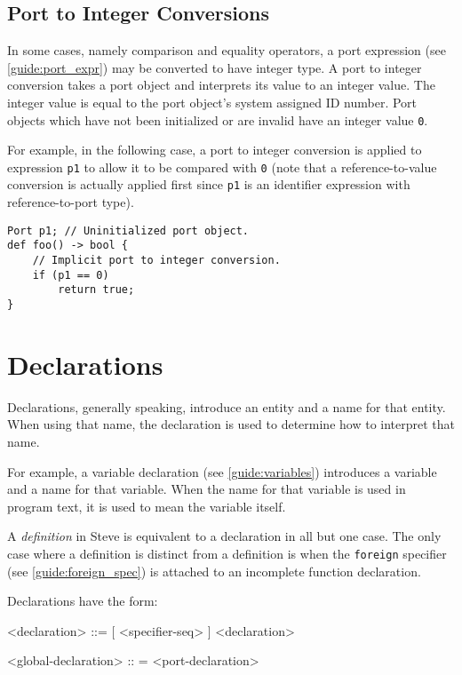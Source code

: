 \subsection{Port to Integer Conversions} \label{guide:port_conv}

In some cases, namely comparison and equality operators, a port expression (see \ref{guide:port_expr}) may be converted to have integer type. A port to integer conversion takes a port object and interprets its value to an integer value. The integer value is equal to the port object's system assigned ID number. Port objects which have not been initialized or are invalid have an integer value \texttt{0}.

For example, in the following case, a port to integer conversion is applied to expression \texttt{p1} to allow it to be compared with \texttt{0} (note that a reference-to-value conversion is actually applied first since \texttt{p1} is an identifier expression with reference-to-port type).

\begin{minip}
\begin{lstlisting}
Port p1; // Uninitialized port object.
def foo() -> bool {
	// Implicit port to integer conversion.
	if (p1 == 0)
		return true;
}
\end{lstlisting}
\end{minip}


\section{Declarations} \label{guide:declarations}

Declarations, generally speaking, introduce an entity and a name for that entity. When using that name, the declaration is used to determine how to interpret that name. 

For example, a variable declaration (see \ref{guide:variables}) introduces a variable and a name for that variable. When the name for that variable is used in program text, it is used to mean the variable itself.

A \textit{definition} in Steve is equivalent to a declaration in all but one case. The only case where a definition is distinct from a definition is when the \texttt{foreign} specifier (see \ref{guide:foreign_spec}) is attached to an incomplete function declaration.

Declarations have the form:

\begin{minip}
\begin{grammar}
<declaration> ::=
[ <specifier-seq> ] <declaration>

<global-declaration> :: =
<port-declaration>
\end{grammar}
\end{minip}

